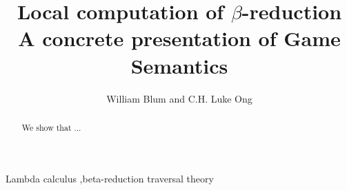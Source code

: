 \documentclass[preprint,12pt]{elsarticle}
\begin{document}
\begin{keyword}
Lambda calculus \sep beta-reduction
traversal theory
\end{keyword}
\begin{frontmatter}
\title{Local computation of $\beta$-reduction\\A concrete presentation of Game Semantics}
\author{William Blum and C.H. Luke Ong}
\address{Oxford University Computing Laboratory}
\begin{abstract}
We show that ...
\end{abstract}
\end{frontmatter}

\tableofcontents \bigskip

\listoftodos
\bigskip





\end{document}
